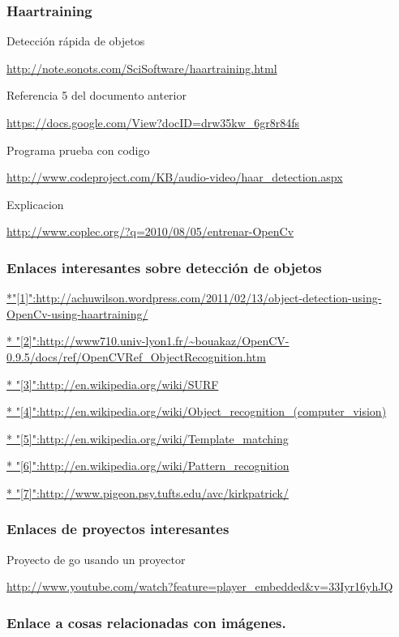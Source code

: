 \documentclass[12pt,a4paper]{report}
\begin{document}
\subsubsection{Haartraining}

Detección rápida de objetos

\url{http://note.sonots.com/SciSoftware/haartraining.html}

Referencia 5 del documento anterior

\url{https://docs.google.com/View?docID=drw35kw_6gr8r84fs}

Programa prueba con codigo

\url{http://www.codeproject.com/KB/audio-video/haar_detection.aspx}

Explicacion

\url{http://www.coplec.org/?q=2010/08/05/entrenar-OpenCv}

\subsubsection{Enlaces interesantes sobre detección de objetos}

\url{*"[1]":http://achuwilson.wordpress.com/2011/02/13/object-detection-using-OpenCv-using-haartraining/}

\url{*
"[2]":http://www710.univ-lyon1.fr/~bouakaz/OpenCV-0.9.5/docs/ref/OpenCVRef_ObjectRecognition.htm}

\url{* "[3]":http://en.wikipedia.org/wiki/SURF}

\url{* "[4]":http://en.wikipedia.org/wiki/Object_recognition_(computer_vision)}

\url{* "[5]":http://en.wikipedia.org/wiki/Template_matching}

\url{* "[6]":http://en.wikipedia.org/wiki/Pattern_recognition}

\url{* "[7]":http://www.pigeon.psy.tufts.edu/avc/kirkpatrick/}

\subsubsection{Enlaces de proyectos interesantes}

Proyecto de go usando un proyector

\url{http://www.youtube.com/watch?feature=player_embedded&v=33Iyr16yhJQ}


\subsubsection{Enlace a cosas relacionadas con imágenes.} 
\end{document}
